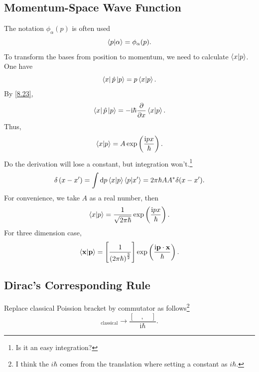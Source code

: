 \documentclass{article}
\theoremstyle{1}
\newcommand{\pa}{\partial}
\newcommand{\ii}{\mathrm{i}}
\begin{document}
\subsection{Momentum-Space Wave Function}
The notation $\phi_\alpha(p)$ is often used 
\begin{equation}
    \braket{p}{\alpha}=\phi_{\alpha}(p).
\end{equation}
To transform the bases from position to momentum, we need to calculate $\braket{x}{p}$.
\newline
One have 
\begin{equation}
    \bra{x}\hat{p}\ket{p}=p\bra{x}\ket{p}.
\end{equation}
By \eqref{8.23},
\begin{equation}
   \bra{x}\hat{p}\ket{p}=-\ii\hbar\frac{\pa}{\pa x}\bra{x}\ket{p}.
\end{equation}
Thus, 
\begin{equation}
    \bra{x}\ket{p}=A\exp\left(\frac{\ii px}{\hbar}\right).
\end{equation}
Do the derivation will lose a constant, but integration won't.\footnote{Is it an easy integration?}
\begin{equation}
    \delta\left(x-x'\right)=\int \dd{p}\bra{x}\ket{p}\bra{p}\ket{x'}=2\pi \hbar AA^*\delta(x-x').
\end{equation}
For convenience, we take $A$ as a real number, then 
\begin{equation}
    \bra{x}\ket{p}=\frac{1}{\sqrt{2\pi \hbar}}\exp\left(\frac{\ii px}{\hbar}\right).
\end{equation}
For three dimension case, 
\begin{equation}
    \bra{\mathbf{x}}\ket{\mathbf{p}}=\left[\frac{1}{\left(2\pi\hbar\right)^{\frac{3}{2}}}\right]\exp\left(\frac{\ii\mathbf{p}\cdot\mathbf{x}}{\hbar}\right).
\end{equation}
\subsection{Dirac's Corresponding Rule}
Replace classical Poission bracket by commutator as follows\footnote{I think the $i\hbar$ comes from the translation where setting a constant as $i\hbar$.}
\begin{equation}
    [\quad ,\quad ]_{\text{classical}}\longrightarrow \frac{[\quad ,\quad ]}{\ii\hbar}.
\end{equation}
\end{document}
